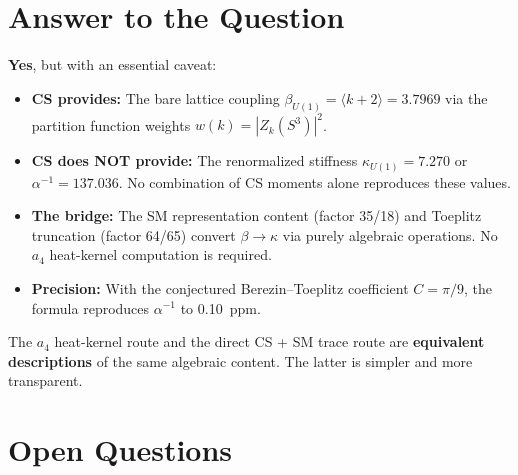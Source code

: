 \documentclass[12pt,a4paper]{article}
\theoremstyle{definition}
\theoremstyle{remark}
\begin{document}
\section{Answer to the Question}
\label{sec:answer}

\begin{tcolorbox}[colback=green!5!white, colframe=green!75!black,
  title={Does CS on $S^3$ directly predict gauge couplings?}]

\textbf{Yes}, but with an essential caveat:

\begin{itemize}
\item \textbf{CS provides:} The bare lattice coupling
  $\beta_{U(1)} = \langle k+2 \rangle = 3.7969$ via the partition
  function weights $w(k) = |Z_k(S^3)|^2$.

\item \textbf{CS does NOT provide:} The renormalized stiffness
  $\kappa_{U(1)} = 7.270$ or $\alpha^{-1} = 137.036$.
  No combination of CS moments alone reproduces these values.

\item \textbf{The bridge:} The SM representation content (factor 35/18)
  and Toeplitz truncation (factor 64/65) convert $\beta \to \kappa$
  via purely algebraic operations.  No $a_4$ heat-kernel computation
  is required.

\item \textbf{Precision:} With the conjectured Berezin--Toeplitz
  coefficient $C = \pi/9$, the formula reproduces $\alpha^{-1}$
  to 0.10~ppm.
\end{itemize}

The $a_4$ heat-kernel route and the direct CS + SM trace route
are \textbf{equivalent descriptions} of the same algebraic content.
The latter is simpler and more transparent.
\end{tcolorbox}

\section{Open Questions}
\label{sec:open}
\end{document}
